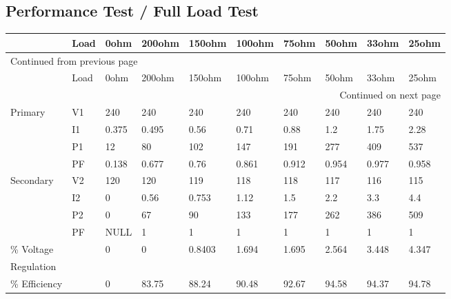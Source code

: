 \documentclass[11pt]{article}
\begin{document}
\subsection{Performance Test / Full Load Test}
\label{sec:org948e2b6}
\begin{longtable}{|l|l|l|l|l|l|l|l|l|l|}
\hline
 & Load & 0ohm & 200ohm & 150ohm & 100ohm & 75ohm & 50ohm & 33ohm & 25ohm\\
\hline
\endfirsthead
\multicolumn{10}{l}{Continued from previous page} \\
\hline

 & Load & 0ohm & 200ohm & 150ohm & 100ohm & 75ohm & 50ohm & 33ohm & 25ohm \\

\hline
\endhead
\hline\multicolumn{10}{r}{Continued on next page} \\
\endfoot
\endlastfoot
\hline
Primary & V1 & 240 & 240 & 240 & 240 & 240 & 240 & 240 & 240\\
\hline
 & I1 & 0.375 & 0.495 & 0.56 & 0.71 & 0.88 & 1.2 & 1.75 & 2.28\\
\hline
 & P1 & 12 & 80 & 102 & 147 & 191 & 277 & 409 & 537\\
\hline
 & PF & 0.138 & 0.677 & 0.76 & 0.861 & 0.912 & 0.954 & 0.977 & 0.958\\
\hline
Secondary & V2 & 120 & 120 & 119 & 118 & 118 & 117 & 116 & 115\\
\hline
 & I2 & 0 & 0.56 & 0.753 & 1.12 & 1.5 & 2.2 & 3.3 & 4.4\\
\hline
 & P2 & 0 & 67 & 90 & 133 & 177 & 262 & 386 & 509\\
\hline
 & PF & NULL & 1 & 1 & 1 & 1 & 1 & 1 & 1\\
\hline
\% Voltage &  & 0 & 0 & 0.8403 & 1.694 & 1.695 & 2.564 & 3.448 & 4.347\\
Regulation &  &  &  &  &  &  &  &  & \\
\hline
\% Efficiency &  & 0 & 83.75 & 88.24 & 90.48 & 92.67 & 94.58 & 94.37 & 94.78\\
\hline
\end{longtable}
\end{document}
